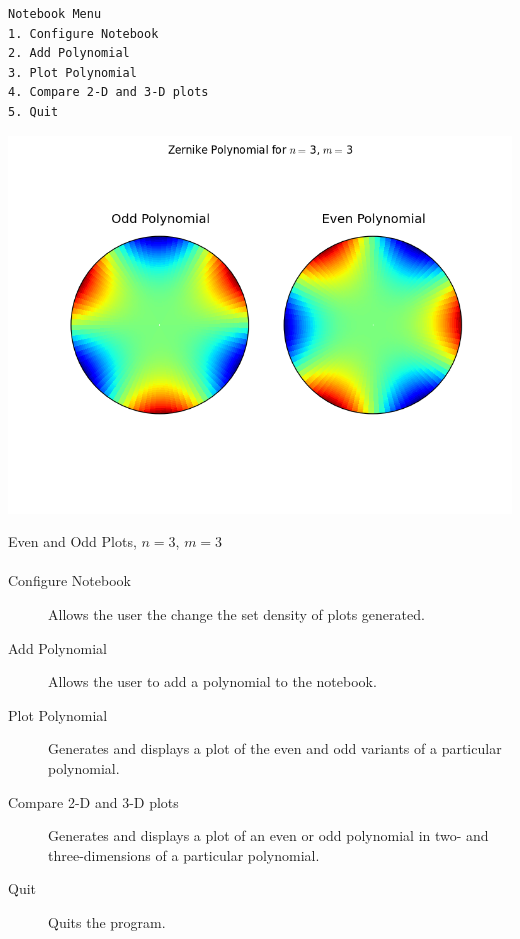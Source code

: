 \documentclass{tufte-handout}
\begin{document}
\begin{verbatim}
Notebook Menu
1. Configure Notebook
2. Add Polynomial
3. Plot Polynomial 
4. Compare 2-D and 3-D plots
5. Quit 
\end{verbatim}

\begin{marginfigure}%
  \includegraphics[width=\linewidth]{img/3-3.png}
  \caption{Even and Odd Plots, $n=3$, $m=3$}
\end{marginfigure}

\paragraph{}
\begin{description}
\item[Configure Notebook] Allows the user the change the set density of plots generated.
\item[Add Polynomial] Allows the user to add a polynomial to the notebook.
\item[Plot Polynomial] Generates and displays a plot of the even and odd variants of a particular polynomial.
\item[Compare 2-D and 3-D plots] Generates and displays a plot of an even or odd polynomial in two- and three-dimensions of a particular polynomial.
\item[Quit] Quits the program.
\end{description}
\end{document}

